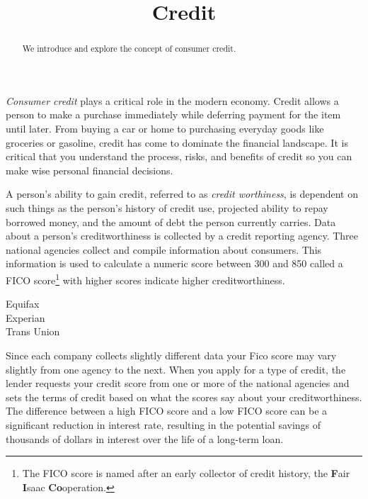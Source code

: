 \documentclass{ximera}
\title{Credit}
\begin{document}
\begin{abstract}
We introduce and explore the concept of consumer credit.
\end{abstract}

\maketitle

\emph{Consumer credit} plays a critical role in the modern economy. Credit allows a person to make a purchase immediately while deferring payment for the item until later. From buying a car or home to purchasing everyday goods like groceries or gasoline, credit has come to dominate the financial landscape. It is critical that you understand the process, risks, and benefits of credit so you can make wise personal financial decisions.

A person's ability to gain credit, referred to as \emph{credit worthiness}, is dependent on such things as the person's history of credit use, projected ability to repay borrowed money, and the amount of debt the person currently carries. Data about a person's creditworthiness is collected by a credit reporting agency. Three national agencies collect and compile information about consumers. This information is used to calculate a numeric score between 300 and 850 called a FICO score\footnote{The FICO score is named after an early collector of credit history, the \textbf{F}air \textbf{I}saac \textbf{Co}operation.} with higher scores indicate higher creditworthiness.
\begin{description}
\item[Equifax] 
\item[Experian] 
\item[Trans Union] 
\end{description}

Since each company collects slightly different data your Fico score may vary slightly from one agency to the next.  When you apply for a type of credit, the lender requests your credit score from one or more of the national agencies and sets the terms of credit based on what the scores say about your creditworthiness. The difference between a high FICO score and a low FICO score can be a significant reduction in interest rate, resulting in the potential savings of thousands of dollars in interest over the life of a long-term loan.
\end{document}
